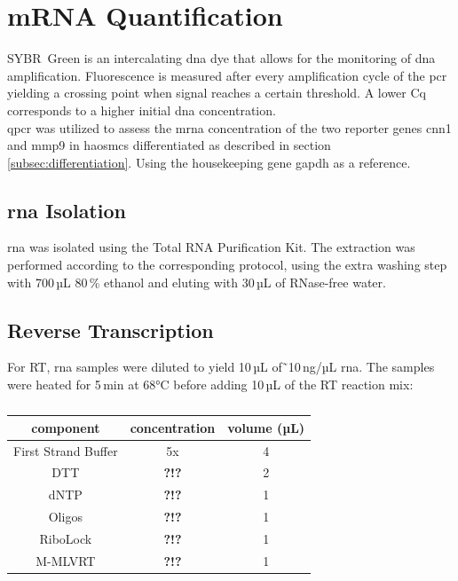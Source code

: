 \section{mRNA Quantification}
\label{sec:qpcr}
SYBR\textregistered~Green is an intercalating \ac{dna} dye that allows for the monitoring of \ac{dna} amplification. Fluorescence is measured after every amplification cycle of the \ac{pcr} yielding a crossing point when signal reaches a certain threshold. A lower \ac{Cq} corresponds to a higher initial \ac{dna} concentration. \cite{huggettStandardisationReportingNucleic2011}\\
\Ac{qpcr} was utilized to assess the m\ac{rna} concentration of the two reporter genes \ac{cnn1} and \ac{mmp9} in \acp{haosmc} differentiated as described in section \ref{subsec:differentiation}. Using the housekeeping gene \ac{gapdh} as a reference.


    \subsection{\ac{rna} Isolation}
    \ac{rna} was isolated using the Total RNA Purification Kit. The extraction was performed according to the corresponding protocol, using the extra washing step with 700\,µL 80\,\% ethanol and eluting with 30\,µL of RNase-free water.

    \subsection{Reverse Transcription}
    For \ac{RT}, \ac{rna} samples were diluted to yield 10\,µL of \~\,10\,ng/µL \ac{rna}. The samples were heated for 5\,min at 68°C before adding 10\,µL of the \ac{RT} reaction mix:

    \begin{table}[h]
    \capstart
	\centering
	\begin{minipage}{\captionwidth}
	   	\caption[RT mastermix]{}
	   	\label{tab:RT Mastr Mix}
	\end{minipage}
    \begin{tabular}{|c|c|c|}
        \hline
        component               & concentration & volume (µL) \\ \hline
        First Strand Buffer     & 5x            & 4           \\
        \acs{DTT}               &\textbf{\color{red} ?!?}               & 2           \\
        \acs{dNTP}              &\textbf{\color{red} ?!?}               & 1           \\
        Oligos                  &\textbf{\color{red} ?!?}               & 1           \\
        RiboLock                &\textbf{\color{red} ?!?}               & 1           \\
        M-MLVRT                 &\textbf{\color{red} ?!?}               & 1           \\ \hline
    \end{tabular}
    \end{table}

